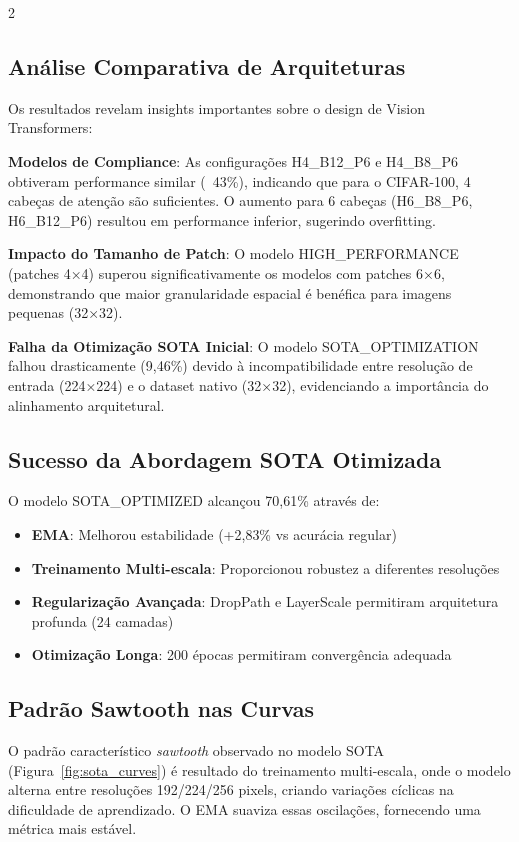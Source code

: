 \documentclass[conference]{IEEEtran}
\begin{document}
\begin{multicols}{2}
\subsection{Análise Comparativa de Arquiteturas}
Os resultados revelam insights importantes sobre o design de Vision Transformers:

\textbf{Modelos de Compliance}: As configurações H4\_B12\_P6 e H4\_B8\_P6 obtiveram performance similar (~43\%), indicando que para o CIFAR-100, 4 cabeças de atenção são suficientes. O aumento para 6 cabeças (H6\_B8\_P6, H6\_B12\_P6) resultou em performance inferior, sugerindo overfitting.

\textbf{Impacto do Tamanho de Patch}: O modelo HIGH\_PERFORMANCE (patches 4×4) superou significativamente os modelos com patches 6×6, demonstrando que maior granularidade espacial é benéfica para imagens pequenas (32×32).

\textbf{Falha da Otimização SOTA Inicial}: O modelo SOTA\_OPTIMIZATION falhou drasticamente (9,46\%) devido à incompatibilidade entre resolução de entrada (224×224) e o dataset nativo (32×32), evidenciando a importância do alinhamento arquitetural.

\subsection{Sucesso da Abordagem SOTA Otimizada}
O modelo SOTA\_OPTIMIZED alcançou 70,61\% através de:
\begin{itemize}
    \item \textbf{EMA}: Melhorou estabilidade (+2,83\% vs acurácia regular)
    \item \textbf{Treinamento Multi-escala}: Proporcionou robustez a diferentes resoluções
    \item \textbf{Regularização Avançada}: DropPath e LayerScale permitiram arquitetura profunda (24 camadas)
    \item \textbf{Otimização Longa}: 200 épocas permitiram convergência adequada
\end{itemize}

\subsection{Padrão Sawtooth nas Curvas}
O padrão característico \textit{sawtooth} observado no modelo SOTA (Figura~\ref{fig:sota_curves}) é resultado do treinamento multi-escala, onde o modelo alterna entre resoluções 192/224/256 pixels, criando variações cíclicas na dificuldade de aprendizado. O EMA suaviza essas oscilações, fornecendo uma métrica mais estável.


\end{multicols}
\end{document}
